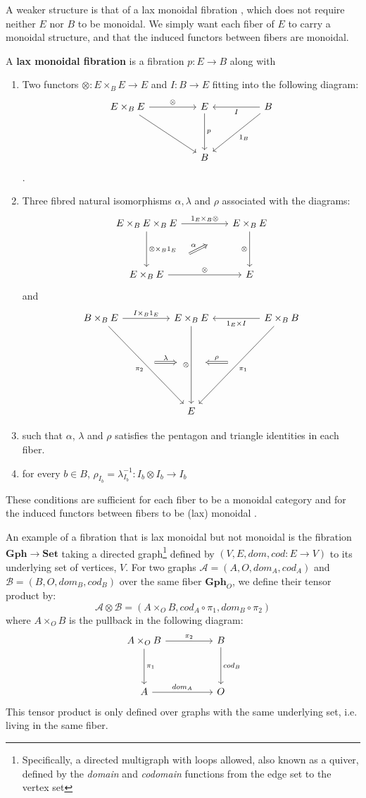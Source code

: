 A weaker structure is that of a lax monoidal fibration \cite{zawadowski}, which does not require neither $E$ nor $B$ to be monoidal. We simply want each fiber of $E$ to carry a monoidal structure, and that the induced functors between fibers are monoidal.
\begin{defn}
A \textbf{lax monoidal fibration} is a fibration $p : E \to B$ along with
\begin{enumerate}
\item Two functors $\otimes : E \times_{B} E \to E$ and $I : B \to E$ fitting into the following diagram:
\[
\ti
E \times_{B} E \ar[r, "\otimes"] \ar[rd] & E \ar[d, "p"] & B \ar[l, "I"] \ar[ld, "1_B"] \\
& B &
\kz
\].
\item Three fibred natural isomorphisms $\alpha, \lambda$ and $\rho$ associated with the diagrams:
\[
\ti
E \times_B E \times_B E \ar[r, "1_E \times_B \otimes"] \ar[d, "\otimes \times_B 1_E"] & E \times_B E \ar[d, "\otimes", swap] \\
E \times_B E \ar[r, "\otimes"] \ar[ru, "\alpha", Rightarrow, shorten <=30pt,shorten >=30pt]  & E
\kz
\]
and
\[
\ti
B \times_B E \ar[r, "I \times_B 1_{E}"] \ar[rdd, "\pi_2",swap] & E \times_B E  \ar[dd, "\otimes",swap] & E \times_B B \ar[ldd, "\pi_1"] \ar[l, "1_E \times I"] \\
\ar[r, "\lambda", xshift=20 pt, Rightarrow, shorten <=30pt, shorten >=30pt] & {}& \ar[l, "\rho", Rightarrow, xshift=-20pt, shorten <=30pt, shorten >=30pt,swap] \\
  & E &  
\kz
\]
\item such that $\alpha$, $\lambda$ and $\rho$ satisfies the pentagon and triangle identities in each fiber.
\item for every $b \in B$, $\rho_{I_b} = \lambda^{-1}_{I_b} : I_b \otimes I_b \to I_b$
\end{enumerate}
\end{defn}
These conditions are sufficient for each fiber to be a monoidal category and for the induced functors between fibers to be (lax) monoidal \cite{zawadowski}.\\
\begin{expl}\label{graphs}
An example of a fibration that is lax monoidal but not monoidal is the fibration $\mathbf{Gph} \to \mathbf{Set}$ taking a directed graph\footnote{Specifically, a directed multigraph with loops allowed, also known as a quiver, defined by the \textit{domain} and \textit{codomain} functions from the edge set to the vertex set} defined by $(V, E, dom, cod : E \to V)$ to its underlying set of vertices, $V$. For two graphs $\mathcal{A}= (A, O, dom_A, cod_A)$ and $\mathcal{B} = (B, O, dom_B, cod_B)$ over the same fiber $\mathbf{Gph}_O$, we define their tensor product by:
\[
  \mathcal{A} \otimes \mathcal{B} = (A \times_O B, cod_A \circ \pi_1, dom_B \circ \pi_2)
\]
where $A \times_O B$ is the pullback in the following diagram:
\[
  \ti
  A \times_O B \ar[r, "\pi_2"] \ar[d, "\pi_1"] & B \ar[d, "cod_B"]\\
  A \ar[r, "dom_A"] & O
  \kz
\]
This tensor product is only defined over graphs with the same underlying set, i.e. living in the same fiber.
\end{expl}